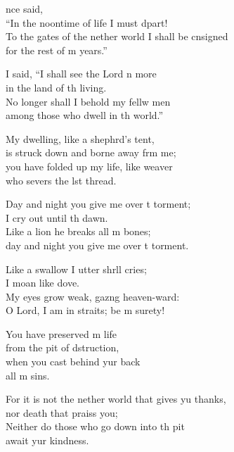 \settowidth{\versewidth}{To the gates of the nether world I shall be con\-signed *}
\begin{psalmverse}%
  \begin{patverse}
    nce  said,\Med\\
“In the noontime of life I must dpart!\\
To the gates of the nether world I shall be cn\-signed\Med\\
for the rest of m years.”

I said, “I shall see the Lord n more\Med\\
in the land of th living.\\
No longer shall I behold my fellw men\Med\\
among those who dwell in th world.”

My dwelling, like a shephrd’s tent,\Med\\
is struck down and borne away frm me;\\
you have folded up my life, like  weaver\Med\\
who severs the lst thread.

Day and night you give me over t torment;\Med\\
I cry out until th dawn.\\
Like a lion he breaks all m bones;\Med\\
day and night you give me over t torment.

Like a swallow I utter shr\pointup{\i}ll cries;\Med\\
I moan like  dove.\\
My eyes grow weak, gaz\pointup{\i}ng heaven-ward:\Med\\
O Lord, I am in straits; be m surety!

You have preserved m life\Med\\
from the pit of dstruction,\\
when you cast behind yur back\Med\\
all m sins.

For it is not the nether world that gives yu thanks,\Med\\
nor death that praiss you;\\
Neither do those who go down into th pit\Med\\
await yur kindness.


\end{patverse}
\end{psalmverse}
